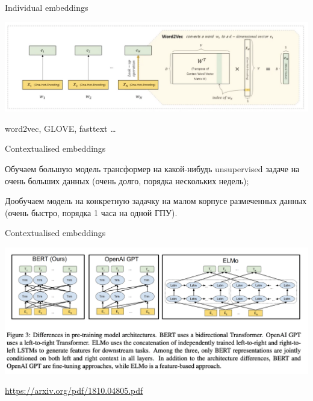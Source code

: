 \documentclass[notes,12pt, aspectratio=169]{beamer}
\newenvironment{wideitemize}{\itemize\addtolength{\itemsep}{10pt}}{\enditemize}
\begin{document}
\begin{frame}{Individual embeddings }
	\begin{center}
			\includegraphics[width=.99\linewidth]{ind_emb.png}
	\end{center}

	\alert{word2vec, GLOVE, fasttext \ldots} 
\end{frame}

\begin{frame}{Contextualised embeddings}
	\begin{wideitemize}
		\item Обучаем большую модель трансформер на какой-нибудь unsupervised задаче на очень больших данных (очень долго, порядка нескольких недель);
		\item Дообучаем модель на конкретную задачку на малом корпусе размеченных данных (очень быстро, порядка 1 часа на одной ГПУ).
	\end{wideitemize}
\end{frame}

\begin{frame}{Contextualised embeddings}
	\begin{center}
		\includegraphics[width=.99\linewidth]{bert.png}
	\end{center}
	\vfill
	\footnotesize
	{\color{blue} \url{https://arxiv.org/pdf/1810.04805.pdf}}
\end{frame}
\end{document}
